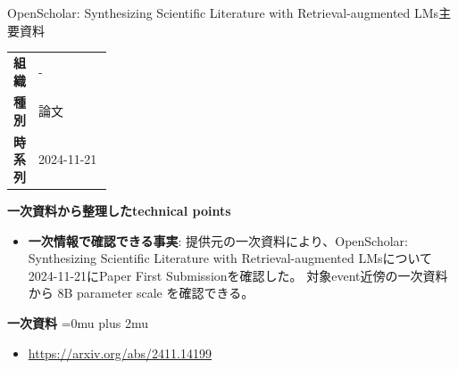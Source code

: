 \begin{technicalnote}{OpenScholar: Synthesizing Scientific Literature with Retrieval-augmented LMs}{主要資料}
\begingroup
\begin{tabularx}{\linewidth}{@{}>{\bfseries}p{0.22\linewidth}X@{}}
組織 & - \\
種別 & 論文 \\
時系列 & 2024-11-21 \\
\end{tabularx}
\smallskip
{\bfseries 一次資料から整理したtechnical points}
\begin{itemize}[leftmargin=1.5em,itemsep=0.35em]
\item \textbf{一次情報で確認できる事実}: 提供元の一次資料により、OpenScholar: Synthesizing Scientific Literature with Retrieval-augmented LMsについて2024-11-21にPaper First Submissionを確認した。 対象event近傍の一次資料から 8B parameter scale を確認できる。
\end{itemize}
\begin{minipage}{\linewidth}
\begin{samepage}
{\bfseries 一次資料}
\begingroup\sloppy
\Urlmuskip=0mu plus 2mu\relax
\begin{itemize}[leftmargin=1.5em,itemsep=0.25em]
\item {\scriptsize\url{https://arxiv.org/abs/2411.14199}}
\end{itemize}
\endgroup
\end{samepage}
\end{minipage}
\endgroup
\end{technicalnote}
\medskip

